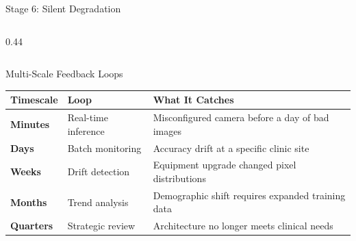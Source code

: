 \documentclass[aspectratio=169, 12pt]{beamer}
\begin{document}
\begin{frame}{Stage 6: Silent Degradation}
\begin{columns}[T]
\begin{column}{0.44\textwidth}
    \vspace{0.05cm}
  \end{column}
\end{columns}

\end{frame}

\begin{frame}{Multi-Scale Feedback Loops}
\note{
%
%
%
%
}

\scriptsize
\renewcommand{\arraystretch}{1.1}
\begin{tabular}{@{}llp{5.5cm}@{}}
  \toprule
  \textbf{Timescale} & \textbf{Loop} & \textbf{What It Catches} \\
  \midrule
  \textcolor{errorstroke}{\textbf{Minutes}}  & Real-time inference  & Misconfigured camera before a day of bad images \\
  \textcolor{routingstroke}{\textbf{Days}}    & Batch monitoring     & Accuracy drift at a specific clinic site \\
  \textcolor{computestroke}{\textbf{Weeks}}   & Drift detection      & Equipment upgrade changed pixel distributions \\
  \textcolor{datastroke}{\textbf{Months}}     & Trend analysis       & Demographic shift requires expanded training data \\
  \textbf{Quarters}   & Strategic review    & Architecture no longer meets clinical needs \\
  \bottomrule
\end{tabular}


\end{frame}
\end{document}
